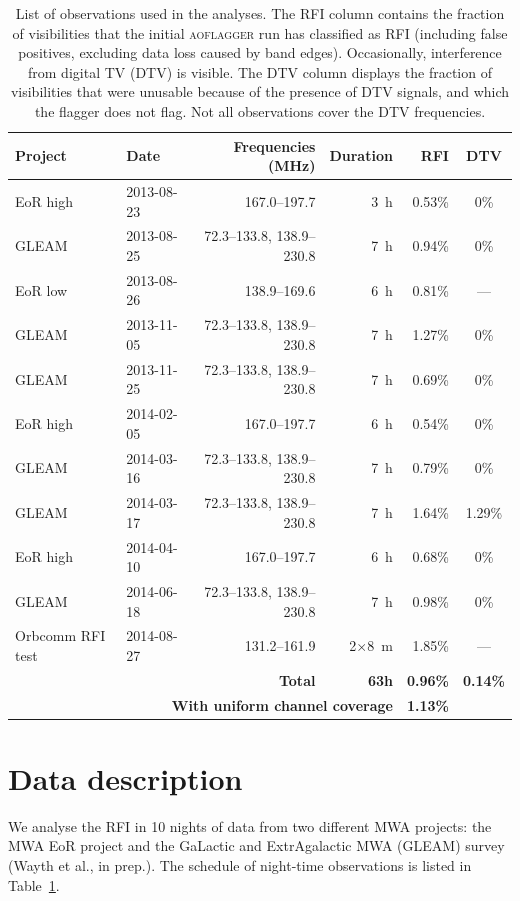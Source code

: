 \documentclass{pasa}
\begin{document}
\begin{table}
\caption{List of observations used in the analyses. The RFI column contains the fraction of visibilities that the initial \textsc{aoflagger} run has classified as RFI (including false positives, excluding data loss caused by band edges). Occasionally, interference from digital TV (DTV) is visible. The DTV column displays the fraction of visibilities that were unusable because of the presence of DTV signals, and which the flagger does not flag. Not all observations cover the DTV frequencies.}\label{tbl:obs-list}
\begin{center}%
\begin{tabular}{|l|l|r|r|r|c|}
\hline
\textbf{Project} &\textbf{Date} & \textbf{Frequencies (MHz)} & \textbf{Duration} & RFI & DTV \\
\hline
EoR high& 2013-08-23 & 167.0--197.7              & 3~h & 0.53\% & 0\% \\
GLEAM & 2013-08-25 & 72.3--133.8, 138.9--230.8 & 7~h & 0.94\% & 0\% \\
EoR low& 2013-08-26 & 138.9--169.6              & 6~h & 0.81\% & ---\\
GLEAM & 2013-11-05 & 72.3--133.8, 138.9--230.8 & 7~h & 1.27\% & 0\% \\
GLEAM & 2013-11-25 & 72.3--133.8, 138.9--230.8 & 7~h & 0.69\% & 0\% \\
EoR high& 2014-02-05 & 167.0--197.7              & 6~h & 0.54\% & 0\%\\
GLEAM & 2014-03-16 & 72.3--133.8, 138.9--230.8 & 7~h & 0.79\% & 0\% \\
GLEAM & 2014-03-17 & 72.3--133.8, 138.9--230.8 & 7~h & 1.64\% & 1.29\% \\
EoR high& 2014-04-10 & 167.0--197.7              & 6~h & 0.68\% & 0\%\\
GLEAM & 2014-06-18 & 72.3--133.8, 138.9--230.8 & 7~h & 0.98\% & 0\% \\
Orbcomm RFI test&2014-08-27& 131.2--161.9     & 2$\times$8~m& 1.85\% & --- \\
\hline
\multicolumn{3}{|r|}{\textbf{Total}} & \textbf{63h} & \textbf{0.96\%} & \textbf{0.14\%}\\
\hline
\multicolumn{4}{|r|}{\textbf{With uniform channel coverage}} & \textbf{1.13\%} & \\
\hline
\end{tabular}
\end{center}
\end{table}

\section{Data description} \label{ch:data-description}
We analyse the RFI in 10 nights of data from two different MWA projects: the MWA EoR project \citep{bowman-science-with-the-mwa-2013} and the GaLactic and ExtrAgalactic MWA (GLEAM) survey (Wayth et al., in prep.). The schedule of night-time observations is listed in Table~\ref{tbl:obs-list}.
\end{document}
